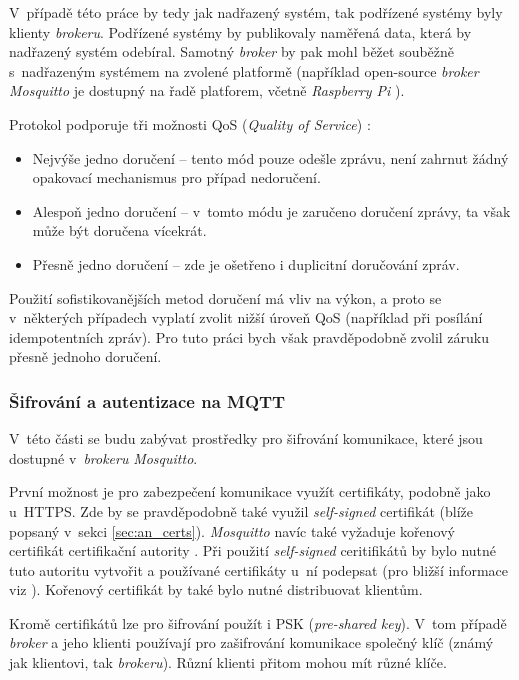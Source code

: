 V~případě této práce by tedy jak nadřazený systém, tak podřízené systémy byly klienty \textit{brokeru}. Podřízené systémy by publikovaly naměřená data, která by nadřazený systém odebíral. Samotný \textit{broker} by pak mohl běžet souběžně s~nadřazeným systémem na zvolené platformě (například open-source \textit{broker Mosquitto} je dostupný na řadě platforem, včetně \textit{Raspberry Pi} \cite{mqtt_mosquitto_wiki}).

Protokol podporuje tři možnosti QoS (\textit{Quality of Service}) \cite{mqtt_valerie}:

\begin{itemize}
    \item Nejvýše jedno doručení -- tento mód pouze odešle zprávu, není zahrnut žádný opakovací mechanismus pro případ nedoručení.
    \item Alespoň jedno doručení -- v~tomto módu je zaručeno doručení zprávy, ta však může být doručena vícekrát.
    \item Přesně jedno doručení -- zde je ošetřeno i duplicitní doručování zpráv.
\end{itemize}

Použití sofistikovanějších metod doručení má vliv na výkon, a proto se v~některých případech vyplatí zvolit nižší úroveň QoS (například při posílání idempotentních zpráv). Pro tuto práci bych však pravděpodobně zvolil záruku přesně jednoho doručení.

\subsubsection{Šifrování a autentizace na MQTT}

V~této části se budu zabývat prostředky pro šifrování komunikace, které jsou dostupné v~\textit{brokeru} \textit{Mosquitto}.

První možnost je pro zabezpečení komunikace využít certifikáty, podobně jako u~HTTPS. Zde by se pravděpodobně také využil \textit{self-signed} certifikát (blíže popsaný v~sekci \ref{sec:an_certs}). \textit{Mosquitto} navíc také vyžaduje kořenový certifikát certifikační autority \cite{mqtt_mosquitto_tsl}. Při použití \textit{self-signed} ceritifikátů by bylo nutné tuto autoritu vytvořit a používané certifikáty u~ní podepsat (pro bližší informace viz \cite{ca_nguyen}). Kořenový certifikát by také bylo nutné distribuovat klientům.

Kromě certifikátů lze pro šifrování použít i PSK (\textit{pre-shared key}). V~tom případě \textit{broker} a jeho klienti používají pro zašifrování komunikace společný klíč (známý jak klientovi, tak \textit{brokeru}). Různí klienti přitom mohou mít různé klíče. \cite{mqtt_mosquitto_conf}

